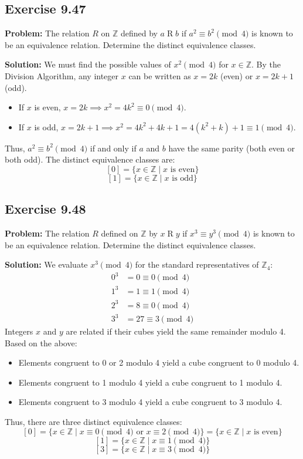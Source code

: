 \documentclass[11pt, a4paper]{article}
\theoremstyle{definition}
\theoremstyle{remark}
\begin{document}
\subsection*{Exercise 9.47}
\textbf{Problem:} The relation $R$ on $\mathbb{Z}$ defined by $a \mathrel{R} b$ if $a^2 \equiv b^2 \pmod{4}$ is known to be an equivalence relation. Determine the distinct equivalence classes.

\textbf{Solution:}
We must find the possible values of $x^2 \pmod{4}$ for $x \in \mathbb{Z}$. By the Division Algorithm, any integer $x$ can be written as $x = 2k$ (even) or $x = 2k + 1$ (odd).
\begin{itemize}
    \item If $x$ is even, $x = 2k \implies x^2 = 4k^2 \equiv 0 \pmod{4}$.
    \item If $x$ is odd, $x = 2k + 1 \implies x^2 = 4k^2 + 4k + 1 = 4(k^2 + k) + 1 \equiv 1 \pmod{4}$.
\end{itemize}
Thus, $a^2 \equiv b^2 \pmod{4}$ if and only if $a$ and $b$ have the same parity (both even or both odd). 
The distinct equivalence classes are:
\[ \displaystyle [0] = \{ x \in \mathbb{Z} \mid x \text{ is even} \} \]
\[ \displaystyle [1] = \{ x \in \mathbb{Z} \mid x \text{ is odd} \} \]

\subsection*{Exercise 9.48}
\textbf{Problem:} The relation $R$ defined on $\mathbb{Z}$ by $x \mathrel{R} y$ if $x^3 \equiv y^3 \pmod{4}$ is known to be an equivalence relation. Determine the distinct equivalence classes.

\textbf{Solution:}
We evaluate $x^3 \pmod{4}$ for the standard representatives of $\mathbb{Z}_4$:
\begin{align*}
    0^3 &= 0 \equiv 0 \pmod{4} \\
    1^3 &= 1 \equiv 1 \pmod{4} \\
    2^3 &= 8 \equiv 0 \pmod{4} \\
    3^3 &= 27 \equiv 3 \pmod{4}
\end{align*}
Integers $x$ and $y$ are related if their cubes yield the same remainder modulo 4. Based on the above:
\begin{itemize}
    \item Elements congruent to 0 or 2 modulo 4 yield a cube congruent to 0 modulo 4.
    \item Elements congruent to 1 modulo 4 yield a cube congruent to 1 modulo 4.
    \item Elements congruent to 3 modulo 4 yield a cube congruent to 3 modulo 4.
\end{itemize}
Thus, there are three distinct equivalence classes:
\[ \displaystyle [0] = \{ x \in \mathbb{Z} \mid x \equiv 0 \pmod{4} \text{ or } x \equiv 2 \pmod{4} \} = \{ x \in \mathbb{Z} \mid x \text{ is even} \} \]
\[ \displaystyle [1] = \{ x \in \mathbb{Z} \mid x \equiv 1 \pmod{4} \} \]
\[ \displaystyle [3] = \{ x \in \mathbb{Z} \mid x \equiv 3 \pmod{4} \} \]
\end{document}
